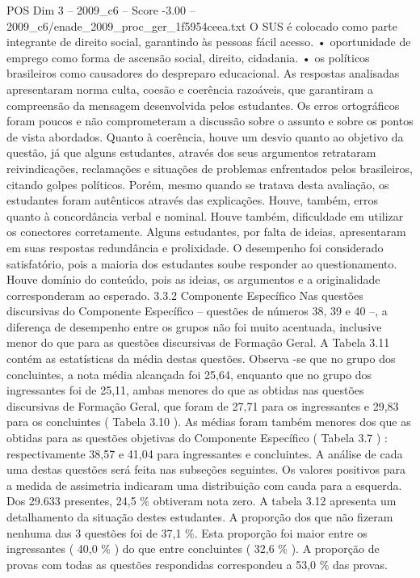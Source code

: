 \begin{textsample}{POS Dim 3 – 2009\_c6 – Score -3.00 – 2009\_c6/enade\_2009\_proc\_ger\_1f5954ceea.txt}
O SUS é colocado como parte integrante de direito social, garantindo às pessoas fácil acesso. • oportunidade de emprego como forma de ascensão social, direito, cidadania. • os políticos brasileiros como causadores do despreparo educacional.
As respostas analisadas apresentaram norma culta, coesão e coerência razoáveis, que garantiram a compreensão da mensagem desenvolvida pelos estudantes.
Os erros ortográficos foram poucos e não comprometeram a discussão sobre o assunto e sobre os pontos de vista abordados.
Quanto à coerência, houve um desvio quanto ao objetivo da questão, já que alguns estudantes, através dos seus argumentos retrataram reivindicações, reclamações e situações de problemas enfrentados pelos brasileiros, citando golpes políticos.
Porém, mesmo quando se tratava desta avaliação, os estudantes foram autênticos através das explicações.
Houve, também, erros quanto à concordância verbal e nominal.
Houve também, dificuldade em utilizar os conectores corretamente.
Alguns estudantes, por falta de ideias, apresentaram em suas respostas redundância e prolixidade.
O desempenho foi considerado satisfatório, pois a maioria dos estudantes soube responder ao questionamento.
Houve domínio do conteúdo, pois as ideias, os argumentos e a originalidade corresponderam ao esperado. 3.3.2 Componente Específico Nas questões discursivas do Componente Específico – questões de números 38, 39 e 40 –, a diferença de desempenho entre os grupos não foi muito acentuada, inclusive menor do que para as questões discursivas de Formação Geral.
A Tabela 3.11 contém as estatísticas da média destas questões.
Observa -se que no grupo dos concluintes, a nota média alcançada foi 25,64, enquanto que no grupo dos ingressantes foi de 25,11, ambas menores do que as obtidas nas questões discursivas de Formação Geral, que foram de 27,71 para os ingressantes e 29,83 para os concluintes ( Tabela 3.10 ).
As médias foram também menores dos que as obtidas para as questões objetivas do Componente Específico ( Tabela 3.7 ) : respectivamente 38,57 e 41,04 para ingressantes e concluintes.
A análise de cada uma destas questões será feita nas subseções seguintes.
Os valores positivos para a medida de assimetria indicaram uma distribuição com cauda para a esquerda.
Dos 29.633 presentes, 24,5 \% obtiveram nota zero.
A tabela 3.12 apresenta um detalhamento da situação destes estudantes.
A proporção dos que não fizeram nenhuma das 3 questões foi de 37,1 \%.
Esta proporção foi maior entre os ingressantes ( 40,0 \% ) do que entre concluintes ( 32,6 \% ).
A proporção de provas com todas as questões respondidas correspondeu a 53,0 \% das provas.

\end{textsample}
